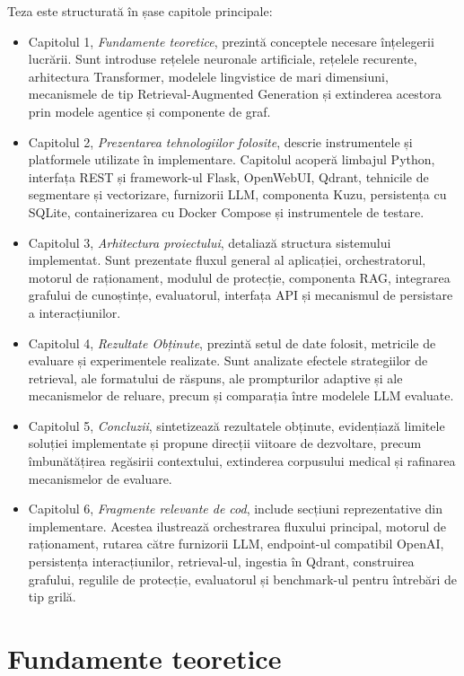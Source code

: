 \documentclass[12pt, a4paper, oneside, romanian]{teza-upb}
\begin{document}
Teza este structurată în șase capitole principale:
\begin{itemize}
    \item Capitolul 1, \textit{Fundamente teoretice}, prezintă conceptele necesare înțelegerii lucrării. Sunt introduse rețelele neuronale artificiale, rețelele recurente, arhitectura Transformer, modelele lingvistice de mari dimensiuni, mecanismele de tip Retrieval-Augmented Generation și extinderea acestora prin modele agentice și componente de graf.
    \item Capitolul 2, \textit{Prezentarea tehnologiilor folosite}, descrie instrumentele și platformele utilizate în implementare. Capitolul acoperă limbajul Python, interfața REST și framework-ul Flask, OpenWebUI, Qdrant, tehnicile de segmentare și vectorizare, furnizorii LLM, componenta Kuzu, persistența cu SQLite, containerizarea cu Docker Compose și instrumentele de testare.
    \item Capitolul 3, \textit{Arhitectura proiectului}, detaliază structura sistemului implementat. Sunt prezentate fluxul general al aplicației, orchestratorul, motorul de raționament, modulul de protecție, componenta RAG, integrarea grafului de cunoștințe, evaluatorul, interfața API și mecanismul de persistare a interacțiunilor.
    \item Capitolul 4, \textit{Rezultate Obținute}, prezintă setul de date folosit, metricile de evaluare și experimentele realizate. Sunt analizate efectele strategiilor de retrieval, ale formatului de răspuns, ale prompturilor adaptive și ale mecanismelor de reluare, precum și comparația între modelele LLM evaluate.
    \item Capitolul 5, \textit{Concluzii}, sintetizează rezultatele obținute, evidențiază limitele soluției implementate și propune direcții viitoare de dezvoltare, precum îmbunătățirea regăsirii contextului, extinderea corpusului medical și rafinarea mecanismelor de evaluare.
    \item Capitolul 6, \textit{Fragmente relevante de cod}, include secțiuni reprezentative din implementare. Acestea ilustrează orchestrarea fluxului principal, motorul de raționament, rutarea către furnizorii LLM, endpoint-ul compatibil OpenAI, persistența interacțiunilor, retrieval-ul, ingestia în Qdrant, construirea grafului, regulile de protecție, evaluatorul și benchmark-ul pentru întrebări de tip grilă.
\end{itemize}


\cleardoublepage
\chapter{Fundamente teoretice}
\end{document}
